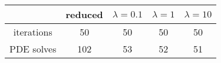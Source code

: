 \begin{tabular}{ccccc}
& reduced & $\lambda = 0.1$ & $\lambda = 1$ & $\lambda = 10$ \\
\hline
iterations & 50 & 50 & 50 & 50 \\
PDE solves & 102 & 53 & 52 & 51 \\
\hline
\end{tabular}
